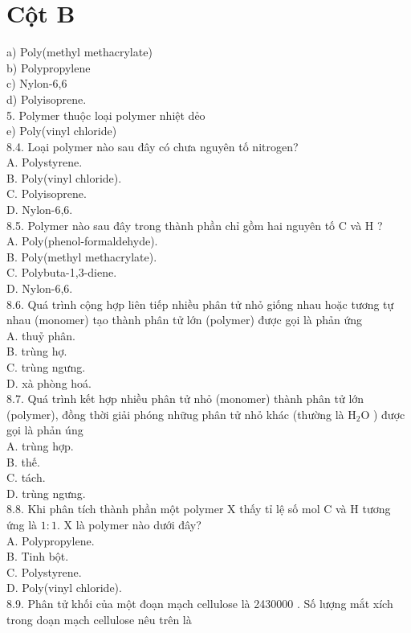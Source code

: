 \documentclass[10pt]{article}
\begin{document}
\section*{Cột B}
a) Poly(methyl methacrylate)\\
b) Polypropylene\\
c) Nylon-6,6\\
d) Polyisoprene.\\
5. Polymer thuộc loại polymer nhiệt dẻo\\
e) Poly(vinyl chloride)\\
8.4. Loại polymer nào sau đây có chưa nguyên tố nitrogen?\\
A. Polystyrene.\\
B. Poly(vinyl chloride).\\
C. Polyisoprene.\\
D. Nylon-6,6.\\
8.5. Polymer nào sau đây trong thành phần chỉ gồm hai nguyên tố C và H ?\\
A. Poly(phenol-formaldehyde).\\
B. Poly(methyl methacrylate).\\
C. Polybuta-1,3-diene.\\
D. Nylon-6,6.\\
8.6. Quá trình cộng hợp liên tiếp nhiều phân tử nhỏ giống nhau hoặc tương tự nhau (monomer) tạo thành phân tử lớn (polymer) được gọi là phản ứng\\
A. thuỷ phân.\\
B. trùng hợ.\\
C. trùng ngưng.\\
D. xà phòng hoá.\\
8.7. Quá trình kết hợp nhiều phân tử nhỏ (monomer) thành phân tử lớn (polymer), đồng thời giải phóng nhữug phân tử nhỏ khác (thường là $\mathrm{H}_{2} \mathrm{O}$ ) được gọi là phản úng\\
A. trùng hợp.\\
B. thế.\\
C. tách.\\
D. trùng ngưng.\\
8.8. Khi phân tích thành phần một polymer X thấy tỉ lệ số mol C và H tương ứng là $1: 1$. X là polymer nào dưới đây?\\
A. Polypropylene.\\
B. Tinh bột.\\
C. Polystyrene.\\
D. Poly(vinyl chloride).\\
8.9. Phân tử khối của một đoạn mạch cellulose là 2430000 . Số lượng mắt xích trong doạn mạch cellulose nêu trên là\\
\end{document}

